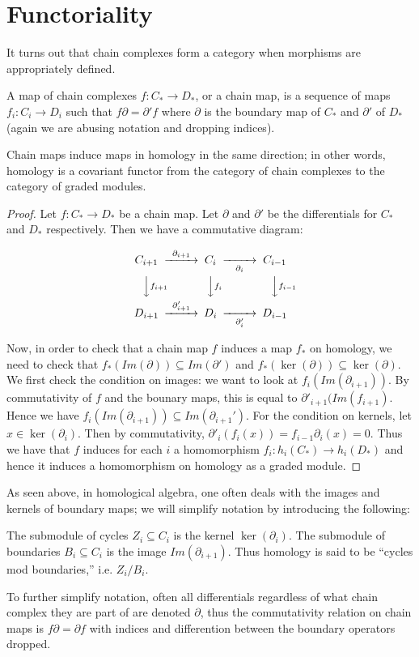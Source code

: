 \section{Functoriality}
It turns out that chain complexes form a category when morphisms are appropriately defined.
\begin{definition} A map of chain complexes $f:C_*\rightarrow D_*$, or a chain map, is a sequence of maps $f_i:C_i\rightarrow D_i$ such that $f\partial = \partial' f$ where $\partial$ is the boundary map of $C_*$ and $\partial'$ of $D_*$ (again we are abusing notation and dropping indices). \end{definition}
\begin{theorem} Chain maps induce maps in homology in the same direction; in other words, homology is a covariant functor from the category of chain complexes to the category of graded modules.\end{theorem}
\begin{proof}
Let $f:C_*\rightarrow D_*$ be a chain map. Let $\partial$ and $\partial'$ be the differentials for $C_*$ and $D_*$ respectively. Then we have a commutative diagram:

\begin{equation}
\begin{CD}
C_{i+1} @>\partial_{i+1}>> C_i @>>\partial_i> C_{i-1}\\
@VV f_{i+1} V          @VV f_i V             @VVf_{i-1} V\\
D_{i+1} @>\partial'_{i+1}>> D_i @>>\partial'_i> D_{i-1}
\end{CD}
\end{equation}

Now, in order to check that a chain map $f$ induces a map $f_*$ on homology, we need to check that $f_*(Im(\partial))\subseteq Im(\partial')$ and $f_*(\ker(\partial))\subseteq \ker(\partial)$. We first check the condition on images: we want to look at $f_i(Im(\partial_{i+1}))$. By commutativity of $f$ and the bounary maps, this is equal to $\partial'_{i+1}(Im(f_{i+1})$. Hence we have $f_i(Im(\partial_{i+1}))\subseteq Im(\partial_{i+1}')$. For the condition on kernels, let $x\in \ker(\partial_i)$. Then by commutativity, $\partial'_i(f_i(x))=f_{i-1}\partial_i(x)=0$. Thus we have that $f$ induces for each $i$ a homomorphism $f_i:h_i(C_*)\rightarrow h_i(D_*)$ and hence it induces a homomorphism on homology as a graded module. \end{proof}

As seen above, in homological algebra, one often deals with the images and kernels of boundary maps; we will simplify notation by introducing the following:
\begin{definition} The submodule of cycles $Z_i\subseteq C_i$ is the kernel $\ker(\partial_i)$. The submodule of boundaries $B_i\subseteq C_i$ is the image $Im(\partial_{i+1})$. Thus homology is said to be ``cycles mod boundaries,'' i.e. $Z_i/B_i$.\end{definition}
To further simplify notation, often all differentials regardless of what chain complex they are part of are denoted $\partial$, thus the commutativity relation on chain maps is $f\partial=\partial f$ with indices and differention between the boundary operators dropped. 

